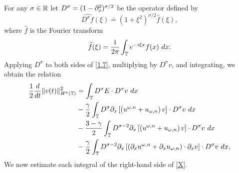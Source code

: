 For any $\sigma \in \mathbb{R}$ let   $D^\sigma=(1-\partial_x^2)^{\sigma/2}$ be the  operator
defined by 
%
$$ \widehat{D^\sigma f}(\xi) \doteq (1 + \xi^2)^{\sigma/2} \widehat{f}(\xi), $$
%
where $ \widehat{f}$ is the Fourier transform
%
$$ \widehat{f}(\xi) =  \frac{1}{2\pi}\int_{\mathbb{T}} e^{-i \xi x} f(x) \ dx.  $$
%
%
Applying $D^\sigma$ to both sides of \eqref{1.7}, multiplying by
$D^\sigma v$, and integrating, we obtain the
relation
%
%
\begin{equation}
\begin{split}
\frac{1}{2}\frac{d}{dt}\|v(t)\|_{H^\sigma(\mathbb{T})}^2
& = \int_{\mathbb{T}} D^\sigma E \cdot D^\sigma
v \ dx
\\
&-
 \frac{\gamma}{2}\int_{\mathbb{T}} D^\sigma
\partial_x \left[ \left( u^{\omega,n} + u_{\omega,n} \right)v
\right]\cdot D^\sigma v \ dx
\\
& -
 \frac{3-\gamma}{2}\int_{\mathbb{T}} D^{\sigma
-2} \partial_x \left[ \left( u^{\omega,n} + u_{\omega,n}
\right)v \right] \cdot D^\sigma v \ dx
\\
& - \frac{\gamma}{2}\int_{\mathbb{T}} D^{\sigma
-2}
\partial_x \left[ \left( \partial_x u^{\omega,n} + \partial_x u_{\omega,n}
\right)\cdot \partial_x v \right] \cdot
D^\sigma v \ dx.
\label{X}
\end{split}
\end{equation}
%
%
We now estimate each integral of the right-hand side
of \eqref{X}.

